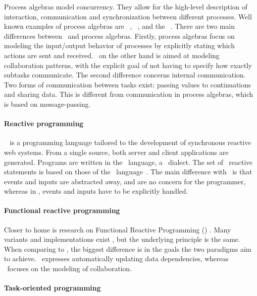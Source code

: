 Process algebras model concurrency.
They allow for the high-level description of interaction, communication and synchronization between different processes.
Well known examples of process algebras are \CSP\ \cite{books/ph/Hoare85}, \CCS\ \cite{books/ph/Milner89}, and the \PICALC\ \cite{books/daglib/0098267}.
There are two main differences between \TOP\ and process algebras.
Firstly, process algebras focus on modeling the input/output behavior of processes by explicitly stating which actions are sent and received.
\TOP\ on the other hand is aimed at modeling collaboration patterns, with the explicit goal of not having to specify how exactly subtasks communicate.
The second difference concerns internal communication.
Two forms of communication between tasks exist: passing values to continuations and sharing data.
This is different from communication in process algebras, which is based on message-passing.


\paragraph{Reactive programming}

\HIPHOP\ \cite{conf/icdcit/BerryS14,journals/corr/BerryS13} is a programming language tailored to the development of synchronous reactive web systems.
From a single source, both server and client applications are generated.
Programs are written in the \HOP\ language, a \SCHEME\ dialect.
The set of \HIPHOP\ reactive statements is based on those of the \ESTEREL\ language~\cite{journals/scp/BerryG92}.
The main difference with \TOPHAT\ is that events and inputs are abstracted away, and are no concern for the programmer, whereas in \HIPHOP, events and inputs have to be explicitly handled.


\paragraph{Functional reactive programming}

Closer to home is research on Functional Reactive Programming (\FRP) \cite{conf/icfp/ElliottH97}.
Many variants and implementations exist \cite{reactive-banana,CooperK04,conf/oopsla/MeyerovichGBCGBK09}, but the underlying principle is the same.
When comparing to \TOP, the biggest difference is in the goals the two paradigms aim to achieve.
\FRP\ expresses automatically updating data dependencies, whereas \TOP\ focuses on the modeling of collaboration.


\paragraph{Task-oriented programming}

